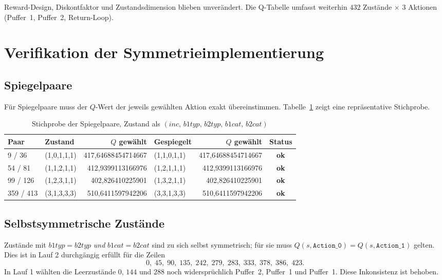 \documentclass[11pt,a4paper]{article}
\newcommand{\ok}{\textcolor{green!55!black}{\textbf{ok}}}
\begin{document}
\noindent
Reward-Design, Diskontfaktor und Zustandsdimension blieben unverändert. Die
Q-Tabelle umfasst weiterhin $432$ Zustände $\times$ $3$ Aktionen
(Puffer~1, Puffer~2, Return-Loop).

\section{Verifikation der Symmetrieimplementierung}

\subsection{Spiegelpaare}

Für Spiegelpaare muss der $Q$-Wert der jeweils gewählten Aktion exakt
übereinstimmen. Tabelle~\ref{tab:spiegelpaare} zeigt eine repräsentative
Stichprobe.

\begin{table}[htbp]
\centering
\caption{Stichprobe der Spiegelpaare, Zustand als $(inc,\,b1typ,\,b2typ,\,b1cat,\,b2cat)$}
\label{tab:spiegelpaare}
\small
\begin{tabular}{@{}llr lr c@{}}
\toprule
\textbf{Paar} & \textbf{Zustand} & \textbf{$Q$ gewählt} &
\textbf{Gespiegelt} & \textbf{$Q$ gewählt} & \textbf{Status} \\
\midrule
9 / 36    & (1,0,1,1,1) & 417,64688454714667 & (1,1,0,1,1) & 417,64688454714667 & \ok \\
54 / 81   & (1,1,2,1,1) & 412,9399113166976  & (1,2,1,1,1) & 412,9399113166976  & \ok \\
99 / 126  & (1,2,3,1,1) & 402,826410225901   & (1,3,2,1,1) & 402,826410225901   & \ok \\
359 / 413 & (3,1,3,3,3) & 510,6411597942206  & (3,3,1,3,3) & 510,6411597942206  & \ok \\
\bottomrule
\end{tabular}
\end{table}

\subsection{Selbstsymmetrische Zustände}

Zustände mit $b1typ = b2typ$ \emph{und} $b1cat = b2cat$ sind zu sich selbst
symmetrisch; für sie muss
$Q(s,\texttt{Action\_0}) = Q(s,\texttt{Action\_1})$ gelten. Dies ist in
Lauf 2 durchgängig erfüllt für die Zeilen
\[
  0,\;45,\;90,\;135,\;242,\;279,\;283,\;333,\;378,\;386,\;423 .
\]
In Lauf 1 wählten die Leerzustände $0$, $144$ und $288$ noch widersprüchlich
Puffer~2, Puffer~1 und Puffer~1. Diese Inkonsistenz ist behoben.
\end{document}
